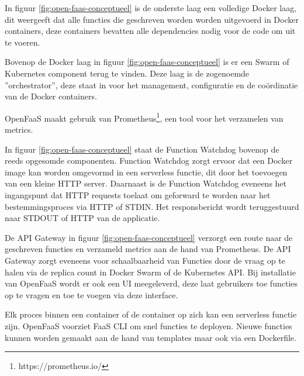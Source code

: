 \begin{description}[style=unboxed, labelwidth=\linewidth, listparindent =0pt]
    \item[Docker laag]
    In figuur \ref{fig:open-faas-conceptueel} is de onderste laag een volledige Docker laag, dit weergeeft dat alle functies die geschreven worden worden uitgevoerd in Docker containers, deze containers bevatten alle dependencies nodig voor de code om uit te voeren.
    \newline
    
    \item[Swarm/Kubernetes]
    Bovenop de Docker laag in figuur \ref{fig:open-faas-conceptueel} is er een Swarm of Kubernetes component terug te vinden. Deze laag is de zogenoemde ''orchestrator'', deze staat in voor het management, configuratie en de coördinatie van de Docker containers.
    \newline
    
    \item[Prometheus]
    OpenFaaS maakt gebruik van Prometheus\footnote{https://prometheus.io/}, een tool voor het verzamelen van metrics.
    \newline
    
    \item[Function Watchdog]
    In figuur \ref{fig:open-faas-conceptueel} staat de Function Watchdog bovenop de reeds opgesomde componenten. Function Watchdog zorgt ervoor dat een Docker image kan worden omgevormd in een serverless functie, dit door het toevoegen van een kleine HTTP server. Daarnaast is de Function Watchdog eveneens het ingangspunt dat HTTP requests toelaat om geforward te worden naar het bestemmingsproces via HTTP of STDIN. Het responsbericht wordt teruggestuurd naar STDOUT of HTTP van de applicatie. \autocite{Ellis2019}
    \newline
    
    \item[API Gateway/UI Portal]
    De API Gateway in figuur \ref{fig:open-faas-conceptueel} verzorgt een route naar de geschreven functies en verzameld metrics aan de hand van Prometheus. De API Gateway zorgt eveneens voor schaalbaarheid van Functies door de vraag op te halen via de replica count in Docker Swarm of de Kubernetes API. Bij installatie van OpenFaaS wordt er ook een UI meegeleverd, deze laat gebruikers toe functies op te vragen en toe te voegen via deze interface. \autocite{Ellis2019} 
    \newline
    
    \item[CLI]
    Elk proces binnen een container of de container op zich kan een serverless functie zijn. OpenFaaS voorziet FaaS CLI om snel functies te deployen. Nieuwe functies kunnen worden gemaakt aan de hand van templates maar ook via een Dockerfile. \autocite{Ellis2019}  
\end{description}

